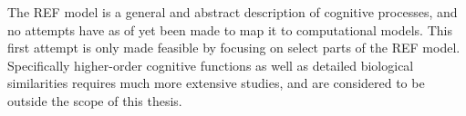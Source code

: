 \documentclass[report.tex]{subfiles}
\begin{document}
The \gls{REF} model is a general and abstract description of cognitive
processes, and no attempts have as of yet been made to map it to
computational models.
This first attempt is only made feasible by focusing on select parts
of the \gls{REF} model. 
Specifically higher-order cognitive functions as well as detailed 
biological similarities requires much more extensive studies, and are
considered to be outside the scope of this thesis.
\end{document}
